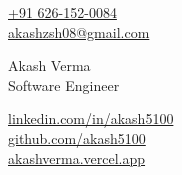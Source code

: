 \documentclass[letterpaper,11pt]{article}
\begin{document}
\setlength{\footskip}{4pt}
\begin{minipage}[b]{0.24\textwidth}
        \small \href{https://wa.me/+916261520084}{+91 626-152-0084} \\
        \small \href{mailto:akashzsh08@gmail.com}{akashzsh08@gmail.com} \vspace{4pt} 
\end{minipage}%
\begin{minipage}[b]{0.5\textwidth}
        \centering
        {\Huge Akash Verma} \\ %
        \vspace{5pt}
        {\Large{Software Engineer} \vspace{5pt}}  \\
\end{minipage}%
\begin{minipage}[b]{0.26\textwidth}
        \flushright \small  %
        {\href{https://www.linkedin.com/in/akash5100/}{linkedin.com/in/akash5100}} \\
        \href{https://github.com/akash5100}{github.com/akash5100} \\
        \href{https://akashverma.vercel.app}{akashverma.vercel.app} \\
        \vspace{4pt}
\end{minipage}  
    
\end{document}
